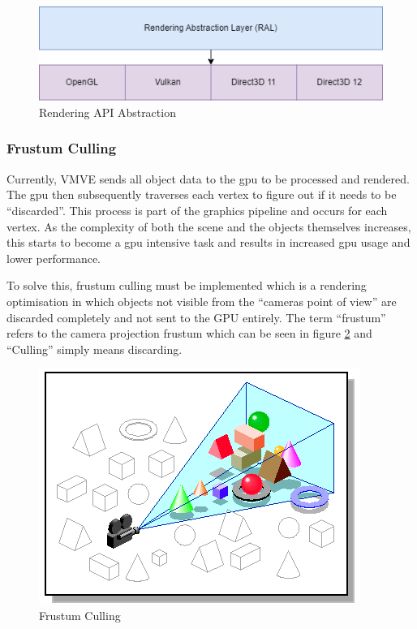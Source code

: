 \documentclass[11pt]{article}
\begin{document}
\begin{figure}[H]
  \centering
  \includegraphics[width=\textwidth]{images/api_abstraction.png}
  \caption{Rendering API Abstraction}
  \label{fig:api_abstraction}
\end{figure}

\subsubsection{Frustum Culling}
Currently, VMVE sends all object data to the \gls*{gpu} to be processed and
rendered. The \gls*{gpu} then subsequently traverses each vertex to figure out if
it needs to be ``discarded''. This process is part of the graphics pipeline and
occurs for each vertex. As the complexity of both the scene and the objects
themselves increases, this starts to become a \gls*{gpu} intensive task and
results in increased \gls*{gpu} usage and lower performance.

To solve this, frustum culling must be implemented which is a rendering
optimisation in which objects not visible from the ``cameras point of view'' are
discarded completely and not sent to the GPU entirely. The term ``frustum'' refers
to the camera projection frustum which can be seen in figure
\ref{fig:frustum_culling} and ``Culling'' simply means discarding.

\begin{figure}[H]
  \centering
  \includegraphics[width=\textwidth]{images/frustum_culling.png}
  \caption{Frustum Culling \cite{frustum_culling}}
  \label{fig:frustum_culling}
\end{figure}
\end{document}
